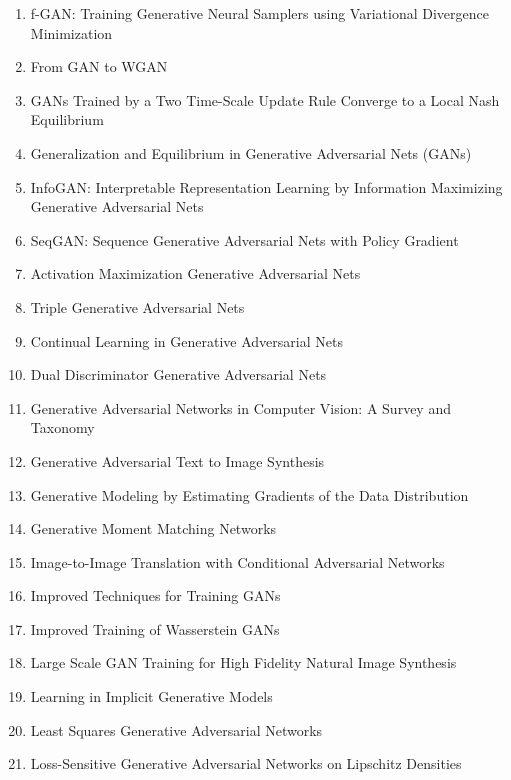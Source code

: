 \documentclass[acmlarge]{acmart}
\begin{document}
\begin{enumerate}
	\item f-GAN: Training Generative Neural Samplers using Variational Divergence Minimization \cite{nowozin2016fgan}
	\item From GAN to WGAN \cite{weng2019gan}
	\item GANs Trained by a Two Time-Scale Update Rule Converge to a Local Nash Equilibrium \cite{heusel2017gans}
	\item Generalization and Equilibrium in Generative Adversarial Nets (GANs) \cite{arora2017generalization}
	\item InfoGAN: Interpretable Representation Learning by Information Maximizing Generative Adversarial Nets \cite{chen2016infogan}
	\item SeqGAN: Sequence Generative Adversarial Nets with Policy Gradient \cite{yu2016seqgan}
	\item Activation Maximization Generative Adversarial Nets \cite{zhou2017activation}
	\item Triple Generative Adversarial Nets \cite{li2017triple}
	\item Continual Learning in Generative Adversarial Nets \cite{seff2017continual}
	\item Dual Discriminator Generative Adversarial Nets \cite{nguyen2017dual}
	\item Generative Adversarial Networks in Computer Vision: A Survey and Taxonomy \cite{wang2019generative}
	\item Generative Adversarial Text to Image Synthesis \cite{reed2016generative}
	\item Generative Modeling by Estimating Gradients of the Data Distribution \cite{song2019generative}
	\item Generative Moment Matching Networks \cite{li2015generative}
	\item Image-to-Image Translation with Conditional Adversarial Networks \cite{isola2016imagetoimage}
	\item Improved Techniques for Training GANs \cite{salimans2016improved}
	\item Improved Training of Wasserstein GANs \cite{gulrajani2017improved}
	\item Large Scale GAN Training for High Fidelity Natural Image Synthesis \cite{brock2018large}
	\item Learning in Implicit Generative Models \cite{mohamed2016learning}
	\item Least Squares Generative Adversarial Networks \cite{mao2016squares}
	\item Loss-Sensitive Generative Adversarial Networks on Lipschitz Densities \cite{qi2017losssensitive}

\end{enumerate}
\end{document}
